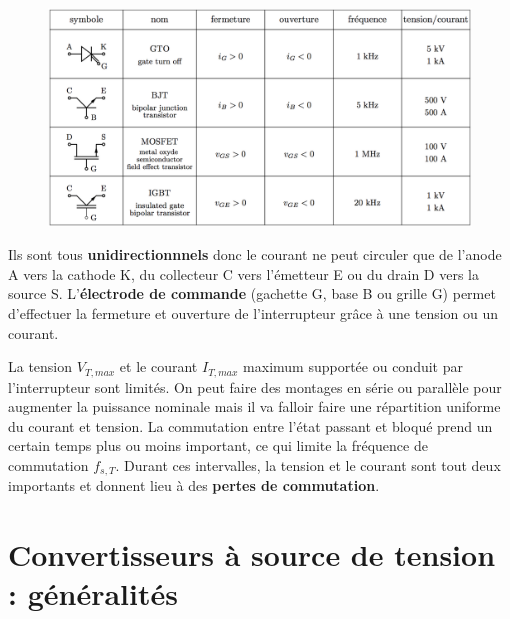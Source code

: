 	\begin{figure}
	\vspace{-5mm}
	\includegraphics[scale=0.2]{ch4/5}
	\end{figure}
	Ils sont tous \textbf{unidirectionnnels} donc le courant ne peut circuler que de l'anode A vers la cathode K, du collecteur C vers l'émetteur E ou du drain D vers la source S. L'\textbf{électrode de commande} (gachette G, base B ou grille G) permet d'effectuer la fermeture et ouverture de l'interrupteur grâce à une tension ou un courant. 
	
	La tension $V_{T,max}$ et le courant $I_{T,max}$ maximum supportée ou conduit par l'interrupteur sont limités. On peut faire des montages en série ou parallèle pour augmenter la puissance nominale mais il va falloir faire une répartition uniforme du courant et tension. La commutation entre l'état passant et bloqué prend un certain temps plus ou moins important, ce qui limite la fréquence de commutation $f_{s,T}$. Durant ces intervalles, la tension et le courant sont tout deux importants et donnent lieu à des \textbf{pertes de commutation}.
	
\section{Convertisseurs à source de tension : généralités}
